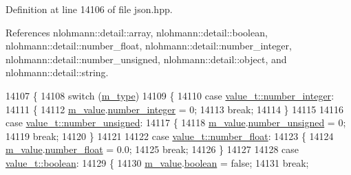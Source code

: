 Definition at line 14106 of file json.\+hpp.



References nlohmann\+::detail\+::array, nlohmann\+::detail\+::boolean, nlohmann\+::detail\+::number\+\_\+float, nlohmann\+::detail\+::number\+\_\+integer, nlohmann\+::detail\+::number\+\_\+unsigned, nlohmann\+::detail\+::object, and nlohmann\+::detail\+::string.


\begin{DoxyCode}
14107     \{
14108         \textcolor{keywordflow}{switch} (\hyperlink{classnlohmann_1_1basic__json_a91990b60d7d4d67968a2c1db677536e7}{m\_type})
14109         \{
14110             \textcolor{keywordflow}{case} \hyperlink{namespacenlohmann_1_1detail_a1ed8fc6239da25abcaf681d30ace4985a5763da164f8659d94a56e29df64b4bcc}{value\_t::number\_integer}:
14111             \{
14112                 \hyperlink{classnlohmann_1_1basic__json_aeb0814f76966f99290cb29e127c90a77}{m\_value}.\hyperlink{unionnlohmann_1_1basic__json_1_1json__value_afa3c414445aeffb56a7c6926f9420941}{number\_integer} = 0;
14113                 \textcolor{keywordflow}{break};
14114             \}
14115 
14116             \textcolor{keywordflow}{case} \hyperlink{namespacenlohmann_1_1detail_a1ed8fc6239da25abcaf681d30ace4985adce7cc8ec29055c4158828921f2f265e}{value\_t::number\_unsigned}:
14117             \{
14118                 \hyperlink{classnlohmann_1_1basic__json_aeb0814f76966f99290cb29e127c90a77}{m\_value}.\hyperlink{unionnlohmann_1_1basic__json_1_1json__value_a0299a6aa3bc4d45d54130e52970f73d3}{number\_unsigned} = 0;
14119                 \textcolor{keywordflow}{break};
14120             \}
14121 
14122             \textcolor{keywordflow}{case} \hyperlink{namespacenlohmann_1_1detail_a1ed8fc6239da25abcaf681d30ace4985ad9966ecb59667235a57b4b999a649eef}{value\_t::number\_float}:
14123             \{
14124                 \hyperlink{classnlohmann_1_1basic__json_aeb0814f76966f99290cb29e127c90a77}{m\_value}.\hyperlink{unionnlohmann_1_1basic__json_1_1json__value_ad003495e39e78b8096e0b6fc690d146f}{number\_float} = 0.0;
14125                 \textcolor{keywordflow}{break};
14126             \}
14127 
14128             \textcolor{keywordflow}{case} \hyperlink{namespacenlohmann_1_1detail_a1ed8fc6239da25abcaf681d30ace4985a84e2c64f38f78ba3ea5c905ab5a2da27}{value\_t::boolean}:
14129             \{
14130                 \hyperlink{classnlohmann_1_1basic__json_aeb0814f76966f99290cb29e127c90a77}{m\_value}.\hyperlink{unionnlohmann_1_1basic__json_1_1json__value_afd0f8ec00c40301efffd01a276959371}{boolean} = \textcolor{keyword}{false};
14131                 \textcolor{keywordflow}{break};

\end{DoxyCode}
